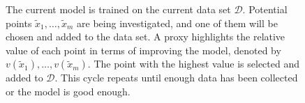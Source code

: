 \documentclass[
  letterpaper,
  numbers=noenddot,
  DIV=11]{scrreprt}
\theoremstyle{definition}
\theoremstyle{plain}
\theoremstyle{plain}
\theoremstyle{remark}
\begin{document}
\begin{figure}


\caption{\label{fig-schema}The current model is trained on the current
data set \(\mathcal{D}\). Potential points
\(\tilde{x}_1, \ldots, \tilde{x}_m\) are being investigated, and one of
them will be chosen and added to the data set. A proxy highlights the
relative value of each point in terms of improving the model, denoted by
\(v(\tilde{x}_1), \ldots, v(\tilde{x}_m)\). The point with the highest
value is selected and added to \(\mathcal{D}\). This cycle repeats until
enough data has been collected or the model is good enough.}

\end{figure}%
\end{document}
